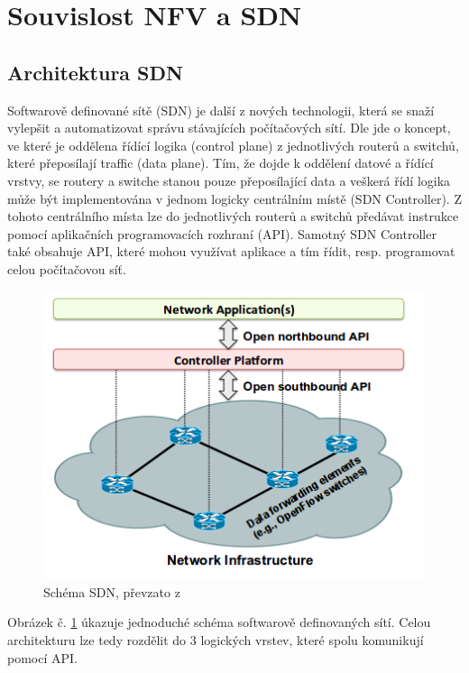 \section{Souvislost NFV a SDN} \label{sub:SDN}


\subsection{Architektura SDN}

Softwarově definované sítě (SDN) je další z nových technologii, která se snaží vylepšit a automatizovat správu stávajících počítačových sítí. Dle \cite{SDN_clanek} jde o koncept, ve které je oddělena řídící logika (control plane) z jednotlivých routerů a switchů, které přeposílají traffic (data plane). Tím, že dojde k oddělení datové a řídící vrstvy, se routery a switche stanou pouze přeposílající data a veškerá řídí logika může být implementována v jednom logicky centrálním místě (SDN Controller). Z tohoto centrálního místa lze do jednotlivých routerů a switchů předávat instrukce pomocí aplikačních programovacích rozhraní (API). Samotný SDN Controller také obsahuje API, které mohou využívat aplikace a tím řídit, resp. programovat celou počítačovou síť.

\begin{figure}[h]
\begin{centering}
\includegraphics[scale=0.60]{images/SDN}
\par\end{centering}
\caption{Schéma SDN, převzato z \cite{SDN_clanek}\label{fig:SDN}}
\end{figure}

Obrázek č. \ref{fig:SDN} úkazuje jednoduché schéma softwarově definovaných sítí. Celou architekturu lze tedy rozdělit do 3 logických vrstev, které spolu komunikují pomocí API. 

